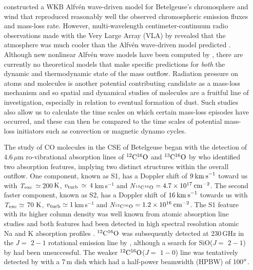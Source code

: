 \documentclass[iop]{emulateapj}
\begin{document}
\cite{1984ApJ...284..238H} constructed a WKB Alfv\'{e}n wave-driven model for Betelgeuse's chromosphere and wind that reproduced reasonably well the observed chromospheric emission fluxes and mass-loss rate. However, multi-wavelength centimeter-continuum radio observations made with the Very Large Array (VLA) by \cite{1998Natur.392..575L} revealed that the atmosphere was much cooler than the Alfv\'{e}n wave-driven model predicted \citep{harper_2001}. Although  new nonlinear Alfv\'{e}n wave models have been computed by \cite{2000ApJ...528..965A}, there are currently no theoretical models that make specific predictions for {\em both} the dynamic and thermodynamic state of the mass outflow. Radiation pressure on atoms and molecules is another potential contributing candidate as a mass-loss mechanism and so spatial and dynamical studies of molecules are a fruitful line of investigation, especially in relation to eventual formation of dust. Such studies also allow us to calculate the time scales on which certain mass-loss episodes have occurred, and these can then be compared to the time scales of potential mass-loss initiators such as convection or magnetic dynamo cycles.

The study of CO molecules in the CSE of Betelgeuse began with the detection of 4.6\,$\mu$m ro-vibrational absorption lines of $\rm{{}^{12}C^{16}O}$ and $\rm{{}^{13}C^{16}O}$ by \cite{1979ApJ...233L.135B} who identified two absorption features, implying two distinct structures within the overall outflow. One component, known as S1, has a Doppler shift of $9\>{\rm km\>s}^{-1}$ toward us with \textit{T}$_{\rm{exc}}\,\simeq$\,200\,$\rm{K}$, $v_{\rm{turb}}\,\simeq\,4$\,km\,s${}^{-1}$ and \textit{N}$_{\rm{^{12}C^{16}O}}=4.7\times 10^{17}\>{\rm cm}^{-2}$. The second faster component, known as S2, has a Doppler shift of $16\>{\rm km\>s}^{-1}$ towards us with \textit{T}$_{\rm{exc}} \simeq$ 70 $\rm{K}$, $v_{\rm{turb}}\simeq 1$\,km\,s${}^{-1}$ and \textit{N}$_{\rm{^{12}C^{16}O}}=1.2\times 10^{16}\>{\rm cm}^{-2}$. The S1 feature with its higher column density was well known from atomic absorption line studies \citep[e.g.,][]{1962ApJ...136..844W} and both features had been detected in high spectral resolution atomic Na and K absorption profiles \citep{1975ApJ...199..427G}. $\rm{{}^{12}C^{16}O}$ was subsequently detected at 230\,GHz in the $J=$ $2-1$ rotational emission line by \cite{1980ApJ...242L..25K}, although a search for SiO($J=$ $2-1$) by \cite{1978ApJ...221..854L} had been unsuccessful. The weaker $\rm{{}^{12}C^{16}O}$($J=$ $1-0$) line was tentatively detected by \cite{1985ApJ...292..640K} with a 7\,m dish which had a half-power beamwidth (HPBW) of 100$\mbox{$^{\prime\prime}$}$.
\end{document}
